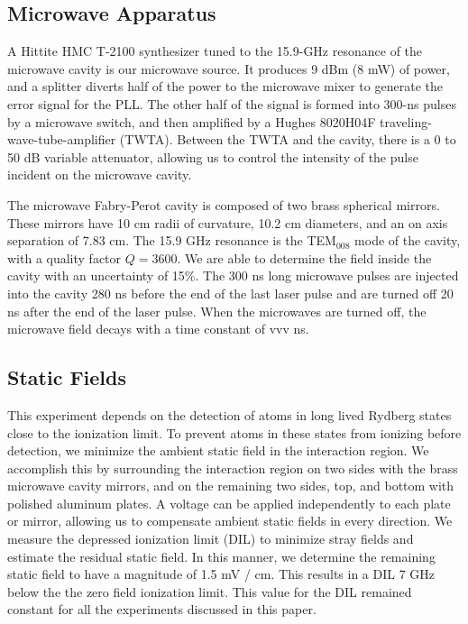\documentclass[aps,pra,preprint,groupedaddress]{revtex4-1}
\begin{document}
\subsection{\label{cavity} Microwave Apparatus}


A Hittite HMC T-2100 synthesizer tuned to the 15.9-GHz resonance of the microwave cavity is our microwave source. It produces 9 dBm (8 mW) of power, and a splitter diverts half of the power to the microwave mixer to generate the error signal for the PLL. The other half of the signal is formed into 300-ns pulses by a microwave switch, and then amplified by a Hughes 8020H04F traveling-wave-tube-amplifier (TWTA). Between the TWTA and the cavity, there is a 0 to 50 dB variable attenuator, allowing us to control the intensity of the pulse incident on the microwave cavity.


The microwave Fabry-Perot cavity is composed of two brass spherical mirrors. These mirrors have 10 cm radii of curvature, 10.2 cm diameters, and an on axis separation of 7.83 cm. The 15.9 GHz resonance is the TEM$_{008}$ mode of the cavity, with a quality factor $Q=3600$. We are able to determine the field inside the cavity with an uncertainty of 15\%. The 300 ns long microwave pulses are injected into the cavity 280 ns before the end of the last laser pulse and are turned off 20 ns after the end of the laser pulse. When the microwaves are turned off, the microwave field decays with a time constant of vvv ns.


\subsection{\label{fields} Static Fields}


This experiment depends on the detection of atoms in long lived Rydberg states close to the ionization limit. To prevent atoms in these states from ionizing before detection, we minimize the ambient static field in the interaction region. We accomplish this by surrounding the interaction region on two sides with the brass microwave cavity mirrors, and on the remaining two sides, top, and bottom with polished aluminum plates. A voltage can be applied independently to each plate or mirror, allowing us to compensate ambient static fields in every direction. We measure the depressed ionization limit (DIL) to minimize stray fields and estimate the residual static field. In this manner, we determine the remaining static field to have a magnitude of 1.5 mV / cm. This results in a DIL 7 GHz below the the zero field ionization limit. This value for the DIL remained constant for all the experiments discussed in this paper.
\end{document}
